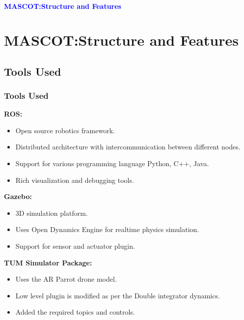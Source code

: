 \documentclass[10pt]{beamer}
\begin{document}
\section*{}
\begin{frame}{}
	\huge{\centerline{\textcolor{blue}{\textbf{MASCOT:Structure and Features}}}}
\end{frame}

\section{MASCOT:Structure and Features}

\subsection*{Tools Used}
\begin{frame}
	\frametitle{Tools Used}
	\begin{block}{\textbf{ROS:}}
		\begin{itemize}
			\item Open source robotics framework.
			\item Distributed architecture with intercommunication between different nodes.
			\item Support for various programming language Python, C++, Java.
			\item Rich visualization and debugging tools.
		\end{itemize}
	\end{block}
	\pause
	\begin{block}{\textbf{Gazebo:}}
		\begin{itemize}
			\item 3D simulation platform.
			\item Uses Open Dynamics Engine for realtime physics simulation.
			\item Support for sensor and actuator plugin.
		\end{itemize}
	\end{block}
	\pause
	\begin{block}{\textbf{TUM Simulator Package:}}
		\begin{itemize}
			\item Uses the AR Parrot drone model.
			\item Low level plugin is modified as per the Double integrator dynamics.
			\item Added the required topics and controls.
		\end{itemize}
	\end{block}
\end{frame}
\end{document}
